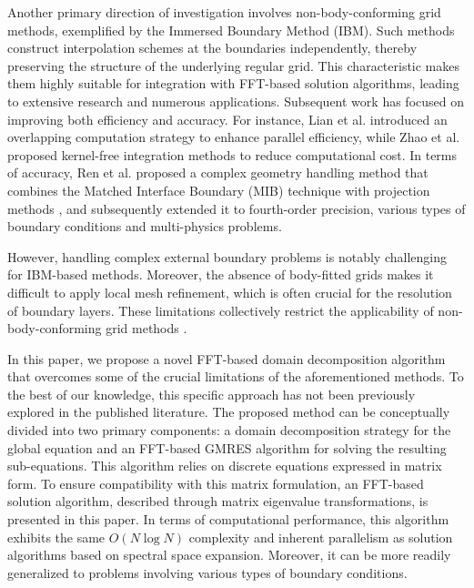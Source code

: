 \documentclass[preprint]{elsarticle}
\begin{document}
Another primary direction of investigation involves non-body-conforming grid methods, exemplified by the Immersed Boundary Method (IBM)\cite{peskin1972flow}. Such methods construct interpolation schemes at the boundaries independently, thereby preserving the structure of the underlying regular grid. This characteristic makes them highly suitable for integration with FFT-based solution algorithms, leading to extensive research and numerous applications\cite{gilmanov2005hybrid, albuquerque2024numerical, chen2024synergistic, chen2024fourier, uhlmann2005immersed}. Subsequent work has focused on improving both efficiency and accuracy. For instance, Lian et al. \cite{lian2025overlapping} introduced an overlapping computation strategy to enhance parallel efficiency, while Zhao et al. \cite{zhao2023kernel} proposed kernel-free integration methods to reduce computational cost. In terms of accuracy, Ren et al. proposed a complex geometry handling method that combines the Matched Interface Boundary (MIB) technique with projection methods \cite{ren2022fft}, and subsequently extended it to fourth-order precision\cite{ren2023fft}, various types of boundary conditions \cite{li2023fast} and multi-physics problems\cite{song2024new}.

However, handling complex external boundary problems is notably challenging for IBM-based methods. Moreover, the absence of body-fitted grids makes it difficult to apply local mesh refinement, which is often crucial for the resolution of boundary layers. These limitations collectively restrict the applicability of non-body-conforming grid methods \cite{verzicco2023immersed}.

In this paper, we propose a novel FFT-based domain decomposition algorithm that overcomes some of the crucial limitations of the aforementioned methods. To the best of our knowledge, this specific approach has not been previously explored in the published literature. The proposed method can be conceptually divided into two primary components: a domain decomposition strategy for the global equation and an FFT-based GMRES \cite{saad1986gmres} algorithm for solving the resulting sub-equations. This algorithm relies on discrete equations expressed in matrix form. To ensure compatibility with this matrix formulation, an FFT-based solution algorithm, described through matrix eigenvalue transformations, is presented in this paper. In terms of computational performance, this algorithm exhibits the same $O\left(N \log N\right)$ complexity and inherent parallelism as solution algorithms based on spectral space expansion. Moreover, it can be more readily generalized to problems involving various types of boundary conditions.
\end{document}
